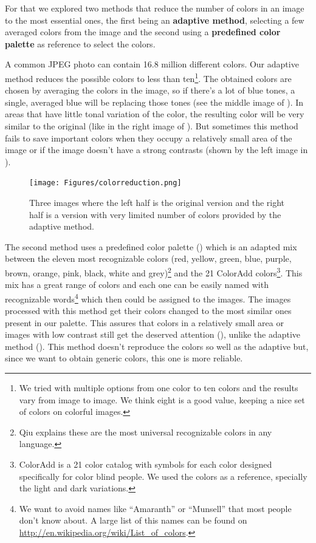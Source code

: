 For that we explored two methods that reduce the number of colors in an image to the most essential ones, the first being an \textbf{adaptive method}, selecting a few averaged colors from the image and the second using a \textbf{predefined color palette} as reference to select the colors.

A common JPEG photo can contain 16.8 million different colors. Our adaptive method reduces the possible colors to less than ten\footnote{We tried with multiple options from one color to ten colors and the results vary from image to image. We think eight is a good value, keeping a nice set of colors on colorful images.}. The obtained colors are chosen by averaging the colors in the image, so if there's a lot of blue tones, a single, averaged blue will be replacing those tones (see the middle image of ). In areas that have little tonal variation of the color, the resulting color will be very similar to the original (like in the right image of ). But sometimes this method fails to save important colors when they occupy a relatively small area of the image or if the image doesn't have a strong contrasts (shown by the left image in ).

\begin{figure}[ht]
	\centering
		\texttt{[image: Figures/colorreduction.png]}
	\caption[Comparison of full color and reduced color images.]{Three images where the left half is the original version and the right half is a version with very limited number of colors provided by the adaptive method.}
	\label{fig:sky}
\end{figure}




The second method uses a predefined color palette () which is an adapted mix between the eleven most recognizable colors (red, yellow, green, blue, purple, brown, orange, pink, black, white and grey)\footnote{Qiu \cite{Qiu:2007p1207} explains these are the most universal recognizable colors in any language.} and the 21 ColorAdd colors\footnote{ColorAdd is a 21 color catalog with symbols for each color designed specifically for color blind people. We used the colors as a reference, specially the light and dark variations.}. This mix has a great range of colors and each one can be easily named with recognizable words\footnote{We want to avoid names like ``Amaranth'' or ``Munsell'' that most people don't know about. A large list of this names can be found on \url{http://en.wikipedia.org/wiki/List_of_colors}.} which then could be assigned to the images. The images processed with this method get their colors changed to the most similar ones present in our palette. This assures that colors in a relatively small area or images with low contrast still get the deserved attention (), unlike the adaptive method (). This method doesn't reproduce the colors so well as the adaptive but, since we want to obtain generic colors, this one is more reliable.


